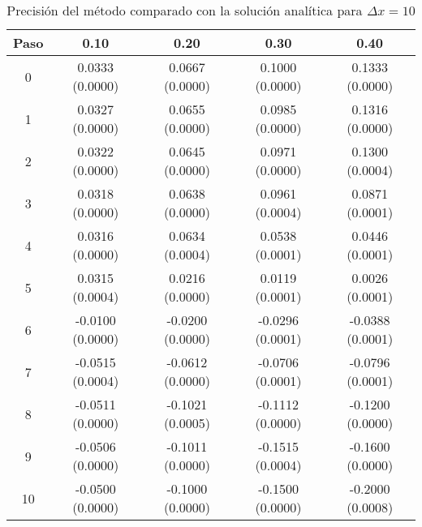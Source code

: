 \documentclass[11pt]{article}
\begin{document}
\begin{table}
\begin{tabular}{ c c c c c }
\hline
Paso & 0.10 & 0.20 & 0.30 & 0.40 \\
\hline
\hline
0 & 0.0333 (0.0000) & 0.0667 (0.0000) & 0.1000 (0.0000) & 0.1333 (0.0000) \\
1 & 0.0327 (0.0000) & 0.0655 (0.0000) & 0.0985 (0.0000) & 0.1316 (0.0000) \\
2 & 0.0322 (0.0000) & 0.0645 (0.0000) & 0.0971 (0.0000) & 0.1300 (0.0004) \\
3 & 0.0318 (0.0000) & 0.0638 (0.0000) & 0.0961 (0.0004) & 0.0871 (0.0001) \\
4 & 0.0316 (0.0000) & 0.0634 (0.0004) & 0.0538 (0.0001) & 0.0446 (0.0001) \\
5 & 0.0315 (0.0004) & 0.0216 (0.0000) & 0.0119 (0.0001) & 0.0026 (0.0001) \\
6 & -0.0100 (0.0000) & -0.0200 (0.0000) & -0.0296 (0.0001) & -0.0388 (0.0001) \\
7 & -0.0515 (0.0004) & -0.0612 (0.0000) & -0.0706 (0.0001) & -0.0796 (0.0001) \\
8 & -0.0511 (0.0000) & -0.1021 (0.0005) & -0.1112 (0.0000) & -0.1200 (0.0000) \\
9 & -0.0506 (0.0000) & -0.1011 (0.0000) & -0.1515 (0.0004) & -0.1600 (0.0000) \\
10 & -0.0500 (0.0000) & -0.1000 (0.0000) & -0.1500 (0.0000) & -0.2000 (0.0008) \\
\end{tabular}
\caption{Precisión del método comparado con la solución analítica para $\Delta{x} = 10$}
\label{eq:compartiva2}
\end{table}
\end{document}
